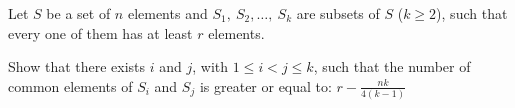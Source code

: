 Let $S$ be a set of $n$ elements and $S_1,\ S_2,\dots,\ S_k$ are subsets of $S$ ($k\geq2$), such that every one of them has at least $r$ elements.

Show that there exists $i$ and $j$,  with $1\leq{i}<j\leq{k}$,  such that the number of common elements of $S_i$ and $S_j$ is greater or equal to: $r-\frac{nk}{4(k-1)}$
